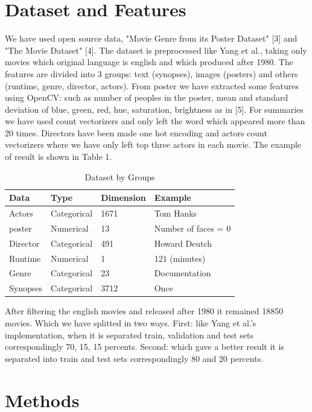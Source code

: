 \documentclass{article}
\begin{document}
\section{Dataset and Features}
\label{headings}

We have used open source data, "Movie Genre from its Poster Dataset" [3] and "The Movie Dataset" [4]. The dataset is preprocessed like Yang et al., taking only movies which original language is english and which produced after 1980. The features are divided into 3 groups: text (synopses), images (posters) and others (runtime, genre, director, actors). From poster we have extracted some features using OpenCV: such as number of peoples in the poster, mean and standard deviation of blue, green, red, hue, saturation, brightness as in [5]. For summaries we have used count vectorizers and only left the word which appeared more than 20 times. Directors have been made one hot encoding and actors count vectorizers where we have only left top three actors in each movie. The example of result is shown in Table 1. 

\begin{table}
  \caption{Dataset by Groups}
  \label{dataset-table}
  \centering
  \begin{tabular}{llll}
    \toprule
    Data & Type & Dimension & Example  \\
    \midrule
    Actors & Categorical  & 1671 &  Tom Hanks   \\
    poster & Numerical & 13 & Number of faces = 0 \\
    Director & Categorical & 491 & Howard Deutch \\
    Runtime & Numerical & 1 & 121 (minutes) \\
    Genre & Categorical & 23 & Documentation \\
    Synopses & Categorical & 3712 & Once \\
    \bottomrule
  \end{tabular}
\end{table}

After filtering the english movies and released after 1980 it remained 18850 movies. Which we have splitted in two ways. First: like Yang et al.'s implementation, when it is separated train, validation and test sets correspondingly 70, 15, 15 percents. Second: which gave a better result it is separated into train and test sets correspondingly 80 and 20 percents. 

\section{Methods}
\label{methods}
\end{document}

